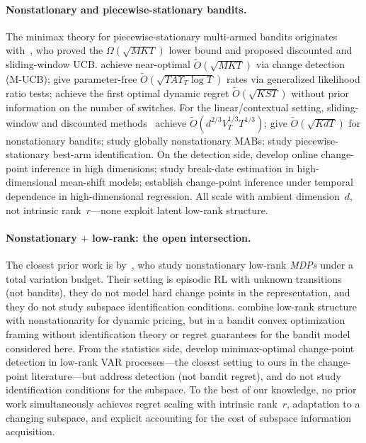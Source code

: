 \documentclass[11pt]{article}
\begin{document}
\paragraph{Nonstationary and piecewise-stationary bandits.}
The minimax theory for piecewise-stationary multi-armed bandits originates
with~\citet{garivier2011upper}, who proved the $\Omega(\sqrt{MKT})$ lower
bound and proposed discounted and sliding-window UCB.
\citet{cao2019nearly} achieve near-optimal $\widetilde{O}(\sqrt{MKT})$
via change detection (M-UCB);
\citet{besson2022efficient} give parameter-free
$\widetilde{O}(\sqrt{T A \Upsilon_T\log T})$ rates via generalized likelihood
ratio tests;
\citet{auer2019achieving} achieve the first optimal dynamic regret
$\widetilde{O}(\sqrt{KST})$ without prior information on the number of switches.
For the linear/contextual setting,
sliding-window and discounted methods~\citep{russac2019weighted,cheung2019learning}
achieve $\widetilde{O}(d^{2/3}V_T^{1/3}T^{1/3})$;
\citet{abbasi2023dynamic} give $\widetilde{O}(\sqrt{KdT})$ for nonstationary
bandits;
\citet{komiyama2024adr} study globally nonstationary MABs;
\citet{hou2024pslb} study piecewise-stationary best-arm identification.
On the detection side, \citet{chen2024cpjasa} develop online change-point inference
in high dimensions;
\citet{wang2023dating_bernoulli} study break-date estimation in high-dimensional
mean-shift models;
\citet{xu2024cp_aos} establish change-point inference under temporal dependence in
high-dimensional regression.
All scale with ambient dimension~$d$, not intrinsic rank~$r$---none
exploit latent low-rank structure.

\paragraph{Nonstationary $+$ low-rank: the open intersection.}
The closest prior work is by~\citet{cheng2023nonstationary}, who study
nonstationary low-rank \emph{MDPs} under a total variation budget.
Their setting is episodic RL with unknown transitions (not bandits),
they do not model hard change points in the representation, and they
do not study subspace identification conditions.
\citet{mueller2019dynamic} combine low-rank structure with nonstationarity
for dynamic pricing, but in a bandit convex optimization framing
without identification theory or regret guarantees for the bandit model
considered here.
From the statistics side, \citet{enikeeva2025cpvar} develop minimax-optimal
change-point detection in low-rank VAR processes---the closest setting to ours
in the change-point literature---but address detection (not bandit regret), and
do not study identification conditions for the subspace.
To the best of our knowledge, no prior work simultaneously achieves regret
scaling with intrinsic rank~$r$, adaptation to a changing subspace, and
explicit accounting for the cost of subspace information acquisition.
\end{document}
